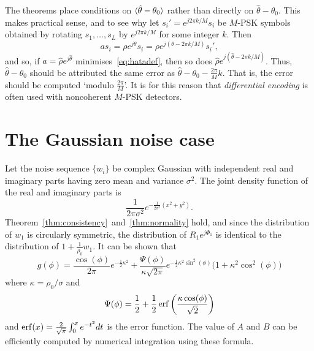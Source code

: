 \documentclass{article}
\begin{document}
The theorems place conditions on $\langle \hat{\theta} - \theta_0 \rangle$ rather than directly on $\hat{\theta} - \theta_0$.  This makes practical sense, and to see why let $s_i' = e^{j2\pi k/M}s_i$ be $M$-PSK symbols obtained by rotating $s_1, \dots, s_L$ by $e^{j2\pi k/M}$ for some integer $k$.  Then
\[
a s_i =  \rho e^{j\theta}s_i = \rho e^{j(\theta - 2\pi k/M)} s_i',
\]
and so, if $a = \hat{\rho}e^{j\hat{\theta}}$ minimises~\eqref{eq:hatadef}, then so does $\hat{\rho} e^{j(\hat{\theta} - 2\pi k/M)}$.  Thus, $\hat{\theta} - \theta_0$ should be attributed the same error as $\hat{\theta} - \theta_0 - \tfrac{2\pi}{M}k$.  That is, the error should be computed `modulo $\tfrac{2\pi}{M}$'.  It is for this reason that \emph{differential encoding} is often used with noncoherent $M$-PSK  detectors. 

\vspace{-0.1cm}
\section{The Gaussian noise case}\label{sec:gaussian-noise-case}
\vspace{-0.1cm}
Let the noise sequence $\{w_i\}$ be complex Gaussian with independent real and imaginary parts having zero mean and variance $\sigma^2$.  The joint density function of the real and imaginary parts is
\vspace{-0.15cm}
\[
\frac{1}{2\pi\sigma^2}e^{-\frac{1}{2\sigma^2}(x^2 + y^2)}.
\]
Theorem~\ref{thm:consistency}~and~\ref{thm:normality} hold, and since the distribution of $w_1$ is circularly symmetric, the distribution of $R_1e^{j\Phi_1}$ is identical to the distribution of $1 + \frac{1}{\rho_0} w_1$.
It can be shown that
\vspace{-0.15cm}
\[
g(\phi) = \frac{\cos(\phi)}{2\pi}e^{-\frac{1}{2}\kappa^2} + \frac{\Psi(\phi)}{\kappa\sqrt{2\pi}}  e^{-\frac{1}{2}\kappa^2\sin^2(\phi)} \big(1 + \kappa^2\cos^2(\phi) \big)
\]
where $\kappa = \rho_0/\sigma$ and
\vspace{-0.15cm}
\[
\Psi(\phi) = \frac{1}{2} + \frac{1}{2} \operatorname{erf}\left(\frac{\kappa \cos(\phi)}{\sqrt{2}}\right)
\]
and $\operatorname{erf}(x) = \frac{2}{\sqrt{\pi}}\int_0^{x} e^{-t^2} dt$ is the error function.  The value of $A$ and $B$ can be efficiently computed by numerical integration using these formula.
\end{document}
